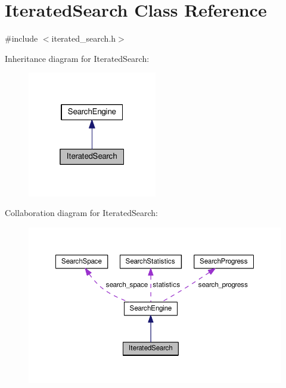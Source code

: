 \hypertarget{classIteratedSearch}{\section{Iterated\-Search Class Reference}
\label{classIteratedSearch}
}


{\ttfamily \#include $<$iterated\-\_\-search.\-h$>$}



Inheritance diagram for Iterated\-Search\-:
\nopagebreak
\begin{figure}[H]
\begin{center}
\leavevmode
\includegraphics[width=160pt]{classIteratedSearch__inherit__graph}
\end{center}
\end{figure}


Collaboration diagram for Iterated\-Search\-:
\nopagebreak
\begin{figure}[H]
\begin{center}
\leavevmode
\includegraphics[width=350pt]{classIteratedSearch__coll__graph}
\end{center}
\end{figure}
